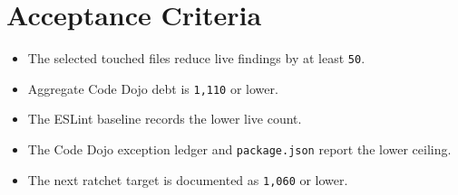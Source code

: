 \section{Acceptance Criteria}\label{record-233-acceptance-criteria}

\begin{itemize}
\tightlist
\item
  The selected touched files reduce live findings by at least \texttt{5\allowbreak{}0}.
\item
  Aggregate Code Dojo debt is \texttt{1\allowbreak{},\allowbreak{}1\allowbreak{}1\allowbreak{}0} or lower.
\item
  The ESLint baseline records the lower live count.
\item
  The Code Dojo exception ledger and \texttt{p\allowbreak{}a\allowbreak{}c\allowbreak{}k\allowbreak{}a\allowbreak{}g\allowbreak{}e\allowbreak{}.\allowbreak{}j\allowbreak{}s\allowbreak{}o\allowbreak{}n} report the lower ceiling.
\item
  The next ratchet target is documented as \texttt{1\allowbreak{},\allowbreak{}0\allowbreak{}6\allowbreak{}0} or lower.
\end{itemize}

